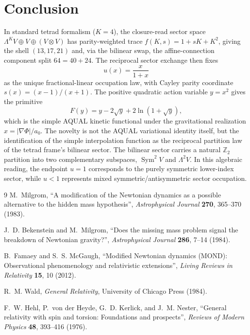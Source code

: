 \documentclass[10pt]{article}
\DeclareMathOperator{\Sym}{Sym}
\begin{document}
\section{Conclusion}
In standard tetrad formalism ($K=4$), the closure-read sector space
$\Lambda^K V\oplus V\oplus(V\otimes V)$ has parity-weighted trace
$f(K,s)=1+sK+K^2$, giving the shell $(13,17,21)$ and, via the bilinear
swap, the affine-connection component split $64=40+24$.  The reciprocal
sector exchange then fixes
\[
        u(x)=\frac{x}{1+x}
\]
as the unique fractional-linear occupation law, with Cayley
parity coordinate $s(x)=(x-1)/(x+1)$.
The positive quadratic action variable $y=x^2$ gives the primitive
\[
        F(y)=y-2\sqrt y+2\ln(1+\sqrt y),
\]
which is the simple AQUAL kinetic functional under the gravitational realization
$x=|\nabla\Phi|/a_0$.
The novelty is not the AQUAL variational identity itself, but the
identification of the simple interpolation function as the reciprocal
partition law of the tetrad frame's bilinear sector.  The bilinear sector
carries a natural $\mathbb Z_2$ partition into two complementary subspaces,
$\Sym^2V$ and $\Lambda^2V$.  In this algebraic reading, the endpoint $u=1$
corresponds to the purely symmetric lower-index sector, while $u<1$
represents mixed symmetric/antisymmetric sector occupation.

\begin{thebibliography}{9}
M.~Milgrom,
``A modification of the Newtonian dynamics as a possible alternative to the
hidden mass hypothesis'',
\emph{Astrophysical Journal} \textbf{270}, 365--370 (1983).

J.~D. Bekenstein and M.~Milgrom,
``Does the missing mass problem signal the breakdown of Newtonian gravity?'',
\emph{Astrophysical Journal} \textbf{286}, 7--14 (1984).

B.~Famaey and S.~S. McGaugh,
``Modified Newtonian dynamics (MOND): Observational phenomenology and
relativistic extensions'',
\emph{Living Reviews in Relativity} \textbf{15}, 10 (2012).

R.~M. Wald,
\emph{General Relativity}, University of Chicago Press (1984).

F.~W. Hehl, P.~von der Heyde, G.~D. Kerlick, and J.~M. Nester,
``General relativity with spin and torsion: Foundations and prospects'',
\emph{Reviews of Modern Physics} \textbf{48}, 393--416 (1976).

\end{thebibliography}
\end{document}

